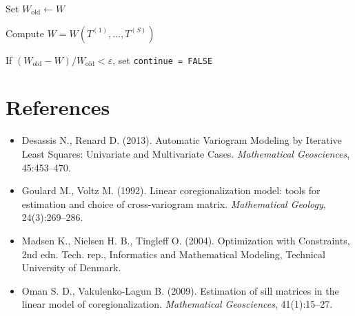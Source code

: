 \documentclass[11pt]{article}
\begin{document}
Set $W_{\text{old}} \leftarrow W$

Compute $W = W(T^{(1)}, \ldots, T^{(S)})$

If $(W_{\text{old}} - W)/W_{\text{old}} < \varepsilon$, set \texttt{continue = FALSE}

\section*{References}

\begin{itemize}
  \item Desassis N., Renard D. (2013). Automatic Variogram Modeling by Iterative Least Squares: Univariate and Multivariate Cases. \textit{Mathematical Geosciences}, 45:453–470.

  \item Goulard M., Voltz M. (1992). Linear coregionalization model: tools for estimation and choice of cross-variogram matrix. \textit{Mathematical Geology}, 24(3):269–286.

  \item Madsen K., Nielsen H. B., Tingleff O. (2004). Optimization with Constraints, 2nd edn. Tech. rep., Informatics and Mathematical Modeling, Technical University of Denmark.

  \item Oman S. D., Vakulenko-Lagun B. (2009). Estimation of sill matrices in the linear model of coregionalization. \textit{Mathematical Geosciences}, 41(1):15–27.
\end{itemize}
\end{document}
